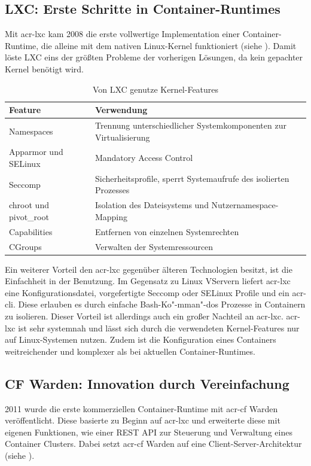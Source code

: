 \subsection{LXC: Erste Schritte in Container-Runtimes}
\label{sec:geschichteLXC}
Mit \gls{acr-lxc} kam 2008 die erste vollwertige Implementation einer Container-Runtime, die alleine mit dem nativen Linux-Kernel funktioniert (siehe ). Damit löste LXC eins der größten Probleme der vorherigen Lösungen, da kein gepachter Kernel benötigt wird.

\begin{table}[h]
		\begin{tabu} to 
			\toprule
			Feature & Verwendung\\
			\midrule
			Namespaces & Trennung unterschiedlicher Systemkomponenten zur Virtualisierung\\
			Apparmor und SELinux & Mandatory Access Control\\
			Seccomp & Sicherheitsprofile, sperrt Systemaufrufe des isolierten Prozesses\\
			chroot und pivot\_root & Isolation des Dateisystems und Nutzernamespace-Mapping\\
			Capabilities & Entfernen von einzelnen Systemrechten\\
			CGroups & Verwalten der Systemressourcen\\
			\bottomrule
		\end{tabu}
	\caption{Von LXC genutze Kernel-Features \citep{Lxc7LinuxManualPage}}
	\label{tab:lxcKernel}
\end{table}

Ein weiterer Vorteil den \gls{acr-lxc} gegenüber älteren Technologien besitzt, ist die Einfachheit in der Benutzung. Im Gegensatz zu Linux VServern liefert \gls{acr-lxc} eine Konfigurationsdatei, vorgefertigte Seccomp oder SELinux Profile und ein \gls{acr-cli}. Diese erlauben es durch einfache Bash-Ko"-mman"-dos Prozesse in Containern zu isolieren. Dieser Vorteil ist allerdings auch ein großer Nachteil an \gls{acr-lxc}. \gls{acr-lxc} ist sehr systemnah und lässt sich durch die verwendeten Kernel-Features nur auf Linux-Systemen nutzen. Zudem ist die Konfiguration eines Containers weitreichender und komplexer als bei aktuellen Container-Runtimes.

\subsection{CF Warden: Innovation durch Vereinfachung}
\label{sec:geschichteCFWarden}
2011 wurde die erste kommerziellen Container-Runtime mit \gls{acr-cf} Warden veröffentlicht. Diese basierte zu Beginn auf \gls{acr-lxc} und erweiterte diese mit eigenen Funktionen, wie einer REST API zur Steuerung und Verwaltung eines Container Clusters. Dabei setzt \gls{acr-cf} Warden auf eine Client-Server-Architektur (siehe ). 

